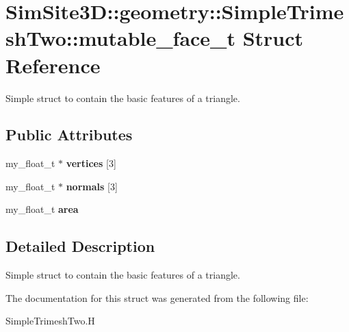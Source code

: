 \section{SimSite3D::geometry::Simple\-Trimesh\-Two::mutable\_\-face\_\-t Struct Reference}
\label{structSimSite3D_1_1geometry_1_1SimpleTrimeshTwo_1_1mutable__face__t}
Simple struct to contain the basic features of a triangle.  


\subsection*{Public Attributes}
\begin{CompactItemize}
\item 
my\_\-float\_\-t $\ast$ \textbf{vertices} [3]\label{structSimSite3D_1_1geometry_1_1SimpleTrimeshTwo_1_1mutable__face__t_4ce4319c87a9201b217b9a970a83b71f}

\item 
my\_\-float\_\-t $\ast$ \textbf{normals} [3]\label{structSimSite3D_1_1geometry_1_1SimpleTrimeshTwo_1_1mutable__face__t_55a28c9e943397967c87fbd1ed77044e}

\item 
my\_\-float\_\-t \textbf{area}\label{structSimSite3D_1_1geometry_1_1SimpleTrimeshTwo_1_1mutable__face__t_28bec723ad7fbb05538d45cf3f46c177}

\end{CompactItemize}


\subsection{Detailed Description}
Simple struct to contain the basic features of a triangle. 



The documentation for this struct was generated from the following file:\begin{CompactItemize}
\item 
Simple\-Trimesh\-Two.H\end{CompactItemize}
